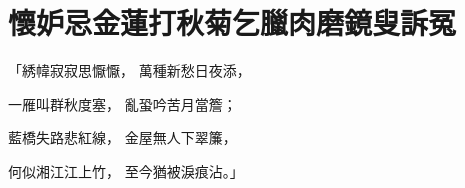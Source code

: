 %

\chapter{懷妒忌金蓮打秋菊\KG 乞臘肉磨鏡叟訴冤}


\begin{showcontents}{}




「綉幃寂寂思懨懨，  萬種新愁日夜添，

一雁叫群秋度塞，  亂蛩吟苦月當簷；

藍橋失路悲紅線，  金屋無人下翠簾，

何似湘江江上竹，  至今猶被淚痕沾。」


\end{showcontents}
